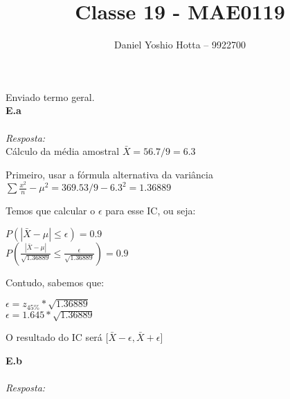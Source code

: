 \documentclass{article}
\begin{document}
	
	\title{Classe 19 - MAE0119}
	\author{Daniel Yoshio Hotta – 9922700}
	
	\maketitle	
	
	Enviado termo geral.\\
	
	\textbf {E.a} 
	\\ \\
	\textit {Resposta:} \\
	
	Cálculo da média amostral $\bar{X} = 56.7 / 9 = 6.3$
	
	Primeiro, usar a fórmula alternativa da variância $\sum \frac{x^2}{n} - \mu^2 = 369.53 / 9 - 6.3^2 = 1.36889$
	
	Temos que calcular o $\epsilon$ para esse IC, ou seja:
	
	\begin{center}
		$P(|\bar{X} - \mu| \leq \epsilon) = 0.9$\\
		$P(\frac{|\bar{X} - \mu|}{\sqrt{ 1.36889}} \leq \frac{\epsilon}{\sqrt{1.36889}}) = 0.9$\\		
	\end{center}
    
    Contudo, sabemos que:
    
    \begin{center}
    	$\epsilon = z_{45\%} * \sqrt{1.36889}$\\
    	$\epsilon = 1.645 * \sqrt{1.36889}$\\
    \end{center}

    O resultado do IC será [$\bar{X} - \epsilon , \bar{X} + \epsilon$]
		
		
		\textbf {E.b} 
		\\ \\
		\textit {Resposta:} \\	
		
		
		
		
	
\end{document}
